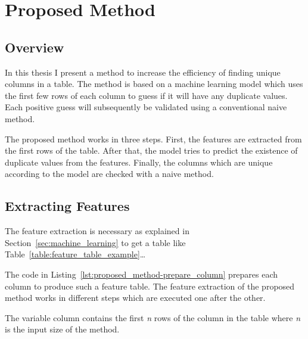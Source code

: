 \chapter{Proposed Method}\label{chap:proposed_method}
\section{Overview}\label{sec:overview}
In this thesis I present a method to increase the efficiency of finding unique columns in a table. The method is based on a machine learning model which uses the first few rows of each column to guess if it will have any duplicate values. Each positive guess will subsequently be validated using a conventional naive method.

The proposed method works in three steps. First, the features are extracted from the first rows of the table. After that, the model tries to predict the existence of duplicate values from the features. Finally, the columns which are unique according to the model are checked with a naive method.



\section{Extracting Features}\label{sec:extracted_features} %
The feature extraction is necessary as explained in Section~\ref{sec:machine_learning} to get a table like Table~\ref{table:feature_table_example}\ldots %




The code in Listing~\ref{lst:proposed_method-prepare_column} prepares each column to produce such a feature table. The feature extraction of the proposed method works in different steps which are executed one after the other.

The variable column contains the first \textit{n} rows of the column in the table where \textit{n} is the input size of the method.

